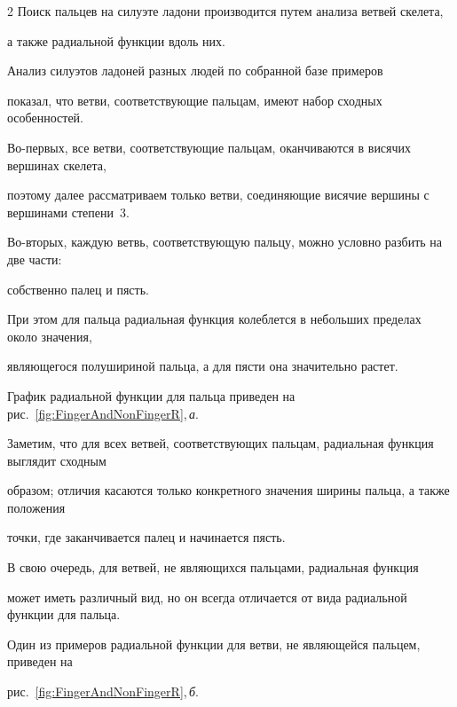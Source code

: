 \begin{multicols}{2}
Поиск пальцев на силуэте ладони производится путем анализа ветвей скелета,


 а также радиальной функции вдоль них.





Анализ силуэтов ладоней разных людей по собранной базе примеров 


показал, что ветви, соответствующие пальцам, имеют набор сходных особенностей.





Во-первых, все ветви, соответствующие пальцам, оканчиваются в висячих вершинах скелета,


поэтому далее рассматриваем только ветви, соединяющие висячие вершины с вершинами степени~3.





Во-вторых, каждую ветвь, соответствующую пальцу, можно условно разбить на две части: 


собственно палец и пясть.


При этом для пальца радиальная функция колеблется в небольших пределах около значения, 


являющегося полушириной пальца, а для пясти она значительно растет.





График радиальной функции для пальца приведен на рис.~\ref{fig:FingerAndNonFingerR},\,\textit{а}.


Заметим, что для всех ветвей, соответствующих пальцам, радиальная функция выглядит сходным 


образом; отличия касаются только конкретного значения ширины пальца, а также положения 


точки, где заканчивается палец и начинается пясть.





В свою очередь, для ветвей, не являющихся пальцами, радиальная функция 


может иметь различный вид, но он всегда отличается от вида радиальной функции для пальца.


Один из примеров радиальной функции для ветви, не являющейся пальцем, приведен на 


рис.~\ref{fig:FingerAndNonFingerR},\,\textit{б}.












\end{multicols}
